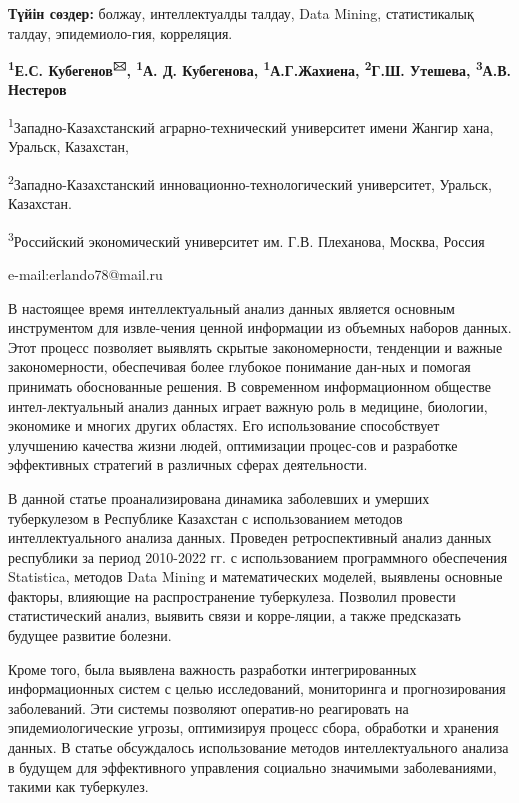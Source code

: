 {\bfseries Түйін сөздер:} болжау, интеллектуалды талдау, Data Mining,
статистикалық талдау, эпидемиоло-гия, корреляция.


\begin{center}
{\bfseries \textsuperscript{1}Е.С. Кубегенов\textsuperscript{🖂},
\textsuperscript{1}А. Д. Кубегенова, \textsuperscript{1}А.Г.Жахиена,
\textsuperscript{2}Г.Ш. Утешева, \textsuperscript{3}А.В. Нестеров}

\textsuperscript{1}Западно-Казахстанский аграрно-технический университет
имени Жангир хана, Уральск, Казахстан,

\textsuperscript{2}Западно-Казахстанский инновационно-технологический
университет, Уральск, Казахстан.

\textsuperscript{3}Российский экономический университет им. Г.В.
Плеханова, Москва, Россия

e-mail:erlando78@mail.ru
\end{center}

В настоящее время интеллектуальный анализ данных является основным
инструментом для извле-чения ценной информации из объемных наборов
данных. Этот процесс позволяет выявлять скрытые закономерности,
тенденции и важные закономерности, обеспечивая более глубокое понимание
дан-ных и помогая принимать обоснованные решения. В современном
информационном обществе интел-лектуальный анализ данных играет важную
роль в медицине, биологии, экономике и многих других областях. Его
использование способствует улучшению качества жизни людей, оптимизации
процес-сов и разработке эффективных стратегий в различных сферах
деятельности.

В данной статье проанализирована динамика заболевших и умерших
туберкулезом в Республике Казахстан с использованием методов
интеллектуального анализа данных. Проведен ретроспективный анализ данных
республики за период 2010-2022 гг. с использованием программного
обеспечения Statistica, методов Data Mining и математических моделей,
выявлены основные факторы, влияющие на распространение туберкулеза.
Позволил провести статистический анализ, выявить связи и корре-ляции, а
также предсказать будущее развитие болезни.

Кроме того, была выявлена важность разработки интегрированных
информационных систем с целью исследований, мониторинга и
прогнозирования заболеваний. Эти системы позволяют оператив-но
реагировать на эпидемиологические угрозы, оптимизируя процесс сбора,
обработки и хранения данных. В статье обсуждалось использование методов
интеллектуального анализа в будущем для эффективного управления
социально значимыми заболеваниями, такими как туберкулез.

